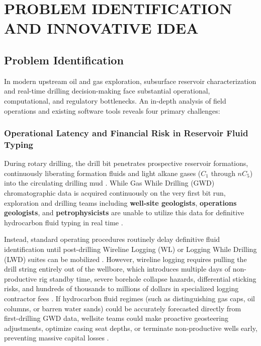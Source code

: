 \chapter{PROBLEM IDENTIFICATION AND INNOVATIVE IDEA}

\section{Problem Identification}

In modern upstream oil and gas exploration, subsurface reservoir characterization and real-time drilling decision-making face substantial operational, computational, and regulatory bottlenecks. An in-depth analysis of field operations and existing software tools reveals four primary challenges:

\subsection{Operational Latency and Financial Risk in Reservoir Fluid Typing}
During rotary drilling, the drill bit penetrates prospective reservoir formations, continuously liberating formation fluids and light alkane gases ($C_1$ through $nC_5$) into the circulating drilling mud \citep{ref9, ref12}. While Gas While Drilling (GWD) chromatographic data is acquired continuously on the very first bit run, exploration and drilling teams including \textbf{well-site geologists}, \textbf{operations geologists}, and \textbf{petrophysicists} are unable to utilize this data for definitive hydrocarbon fluid typing in real time \citep{ref8, ref12}. 

Instead, standard operating procedures routinely delay definitive fluid identification until post-drilling Wireline Logging (WL) or Logging While Drilling (LWD) suites can be mobilized \citep{ref8, ref12}. However, wireline logging requires pulling the drill string entirely out of the wellbore, which introduces multiple days of non-productive rig standby time, severe borehole collapse hazards, differential sticking risks, and hundreds of thousands to millions of dollars in specialized logging contractor fees \citep{ref3, ref9}. If hydrocarbon fluid regimes (such as distinguishing gas caps, oil columns, or barren water sands) could be accurately forecasted directly from first-drilling GWD data, wellsite teams could make proactive geosteering adjustments, optimize casing seat depths, or terminate non-productive wells early, preventing massive capital losses \citep{ref3, ref8}.


